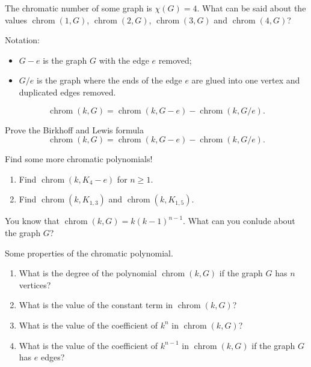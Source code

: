 \documentclass[12pt]{article}
\DeclareMathOperator{\chrom}{chrom}
\begin{document}
\begin{exercise}
    The chromatic number of some graph is $\chi(G) = 4$. 
    What can be said about the values $\chrom(1, G)$, $\chrom(2, G)$, $\chrom(3, G)$ and $\chrom(4, G)$?
\end{exercise}


\begin{theorem}
Notation:
\begin{itemize}
    \item $G - e$ is the graph $G$ with the edge $e$ removed;
    \item $G/e$ is the graph where the ends of the edge $e$ are glued into one vertex and duplicated edges removed.
\end{itemize}
\[
\chrom(k, G) = \chrom(k, G-e) - \chrom(k, G/e).
\]
\end{theorem}

\begin{exercise}
Prove the Birkhoff and Lewis formula 
\[
\chrom(k, G) = \chrom(k, G-e) - \chrom(k, G/e).
\]
\end{exercise}

\begin{exercise}
    Find some more chromatic polynomials!
    \begin{enumerate}[label=\alph*)]
        \item Find $\chrom(k, K_4 - e)$ for $n\geq 1$.
        \item Find $\chrom(k, K_{1,3})$ and $\chrom(k, K_{1,5})$.
    \end{enumerate}

\end{exercise}

\begin{exercise}
You know that $\chrom(k, G) = k(k-1)^{n-1}$. What can you conlude about the graph $G$?    
\end{exercise}


\begin{exercise}
    Some properties of the chromatic polynomial.
\begin{enumerate}[label=\alph*)]
    \item What is the degree of the polynomial $\chrom(k, G)$ if the graph $G$ has $n$ vertices?
    \item What is the value of the constant term in $\chrom(k, G)$?
    \item What is the value of the coefficient of $k^n$ in $\chrom(k, G)$?
    \item What is the value of the coefficient of $k^{n-1}$ in $\chrom(k, G)$ if the graph $G$ has $e$ edges?
\end{enumerate}
\end{exercise}
\end{document}
